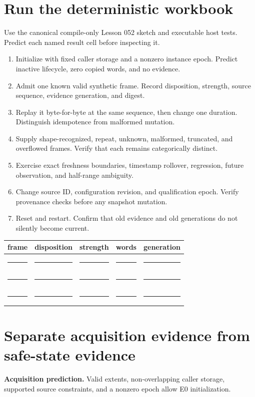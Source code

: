 \documentclass[10pt]{article}
\newcommand{\blankline}{\rule{0.78in}{0.4pt}}
\begin{document}
\newpage
\section{Run the deterministic workbook}
Use the canonical compile-only Lesson 052 sketch and executable host tests.
Predict each named result cell before inspecting it.

\begin{enumerate}
 \item Initialize with fixed caller storage and a nonzero instance epoch.
       Predict inactive lifecycle, zero copied words, and no evidence.
 \item Admit one known valid synthetic frame. Record disposition, strength,
       source sequence, evidence generation, and digest.
 \item Replay it byte-for-byte at the same sequence, then change one duration.
       Distinguish idempotence from malformed mutation.
 \item Supply shape-recognized, repeat, unknown, malformed, truncated, and
       overflowed frames. Verify that each remains categorically distinct.
 \item Exercise exact freshness boundaries, timestamp rollover, regression,
       future observation, and half-range ambiguity.
 \item Change source ID, configuration revision, and qualification epoch.
       Verify provenance checks before any snapshot mutation.
 \item Reset and restart. Confirm that old evidence and old generations do
       not silently become current.
\end{enumerate}

\begin{tabularx}{\linewidth}{@{}X X X X X@{}}
\toprule
frame & disposition & strength & words & generation\\
\midrule
\rule{0pt}{16pt}\blankline & \blankline & \blankline & \blankline & \blankline\\[8pt]
\blankline & \blankline & \blankline & \blankline & \blankline\\[8pt]
\blankline & \blankline & \blankline & \blankline & \blankline\\
\bottomrule
\end{tabularx}

\section{Separate acquisition evidence from safe-state evidence}
\textbf{Acquisition prediction.} Valid extents, non-overlapping caller
storage, supported source constraints, and a nonzero epoch allow E0
initialization.
\end{document}
